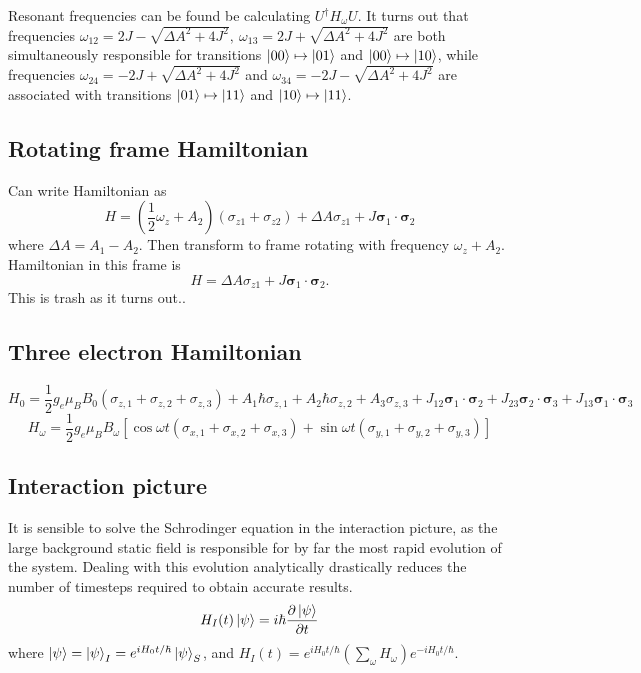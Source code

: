 \documentclass[12pt]{article}
\begin{document}
Resonant frequencies can be found be calculating $U^\dagger H_\omega U$. It turns out that frequencies $\omega_{12} = 2J-\sqrt{\Delta A^2+4J^2},\ \omega_{13}=2J+\sqrt{\Delta A^2+4J^2}$ are both simultaneously responsible for transitions $\ket{00}\mapsto\ket{01}$ and $\ket{00}\mapsto\ket{10}$, while frequencies $\omega_{24}=-2J+\sqrt{\Delta A^2+4J^2}$ and $\omega_{34} = -2J-\sqrt{\Delta A^2+4J^2}$ are associated with transitions $\ket{01}\mapsto\ket{11}$ and $\ket{10}\mapsto\ket{11}$.

\subsection{Rotating frame Hamiltonian}
Can write Hamiltonian as 
\begin{equation}
    H = \left(\frac{1}{2}\omega_z + A_2\right)(\sigma_{z1}+\sigma_{z2}) + \Delta A\sigma_{z1} + J\bm{\sigma}_1\cdot\bm{\sigma}_2
\end{equation}
where $\Delta A=A_1-A_2$. Then transform to frame rotating with frequency $\omega_z+A_2$. Hamiltonian in this frame is
\begin{equation}
    H = \Delta A\sigma_{z1} + J\bm{\sigma}_1\cdot\bm{\sigma}_2.
\end{equation}
This is trash as it turns out..

\subsection{Three electron Hamiltonian}
\begin{dmath}
    H_0 = \frac{1}{2}g_e\mu_BB_0(\sigma_{z,1}+\sigma_{z,2}+\sigma_{z,3}) + A_1\hbar\sigma_{z,1}+A_2\hbar\sigma_{z,2} + A_3\sigma_{z,3} + J_{12}\bm{\sigma}_1\cdot\bm{\sigma}_2+J_{23}\bm{\sigma}_2\cdot\bm{\sigma}_3+J_{13}\bm{\sigma}_1\cdot\bm{\sigma}_3
\end{dmath}
\begin{equation}
H_\omega = \frac{1}{2}g_e\mu_BB_\omega \left[\cos\omega t (\sigma_{x,1}+\sigma_{x,2}+\sigma_{x,3}) + \sin\omega t(\sigma_{y,1} + \sigma_{y,2} + \sigma_{y,3})\right]
\end{equation}

\subsection{Interaction picture}
It is sensible to solve the Schrodinger equation in the interaction picture, as the large background static field is responsible for by far the most rapid evolution of the system. Dealing with this evolution analytically drastically reduces the number of timesteps required to obtain accurate results.
\begin{equation}
    H_I(t)\ket{\psi} = i\hbar\frac{\partial\ket{\psi}}{\partial t}
\end{equation}
where $\ket{\psi}=\ket{\psi}_I = e^{iH_0t/\hbar}\ket{\psi}_S$, and $H_I(t) = e^{iH_0t/\hbar} \left( \sum_\omega H_\omega\right) e^{-iH_0t/\hbar}$.
\end{document}

